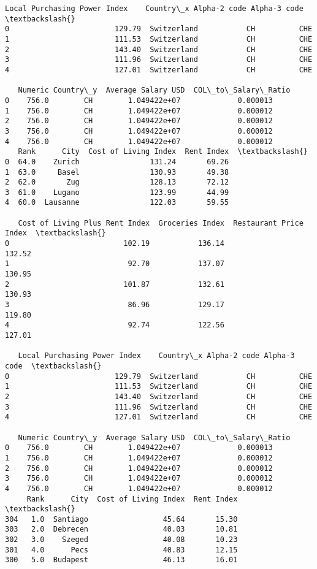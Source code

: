 \documentclass[11pt]{article}
\begin{document}
\begin{Verbatim}[commandchars=\\\{\}]
   Local Purchasing Power Index    Country\_x Alpha-2 code Alpha-3 code  \textbackslash{}
0                        129.79  Switzerland           CH          CHE
1                        111.53  Switzerland           CH          CHE
2                        143.40  Switzerland           CH          CHE
3                        111.96  Switzerland           CH          CHE
4                        127.01  Switzerland           CH          CHE

   Numeric Country\_y  Average Salary USD  COL\_to\_Salary\_Ratio
0    756.0        CH        1.049422e+07             0.000013
1    756.0        CH        1.049422e+07             0.000012
2    756.0        CH        1.049422e+07             0.000012
3    756.0        CH        1.049422e+07             0.000012
4    756.0        CH        1.049422e+07             0.000012
   Rank      City  Cost of Living Index  Rent Index  \textbackslash{}
0  64.0    Zurich                131.24       69.26
1  63.0     Basel                130.93       49.38
2  62.0       Zug                128.13       72.12
3  61.0    Lugano                123.99       44.99
4  60.0  Lausanne                122.03       59.55

   Cost of Living Plus Rent Index  Groceries Index  Restaurant Price Index  \textbackslash{}
0                          102.19           136.14                  132.52
1                           92.70           137.07                  130.95
2                          101.87           132.61                  130.93
3                           86.96           129.17                  119.80
4                           92.74           122.56                  127.01

   Local Purchasing Power Index    Country\_x Alpha-2 code Alpha-3 code  \textbackslash{}
0                        129.79  Switzerland           CH          CHE
1                        111.53  Switzerland           CH          CHE
2                        143.40  Switzerland           CH          CHE
3                        111.96  Switzerland           CH          CHE
4                        127.01  Switzerland           CH          CHE

   Numeric Country\_y  Average Salary USD  COL\_to\_Salary\_Ratio
0    756.0        CH        1.049422e+07             0.000013
1    756.0        CH        1.049422e+07             0.000012
2    756.0        CH        1.049422e+07             0.000012
3    756.0        CH        1.049422e+07             0.000012
4    756.0        CH        1.049422e+07             0.000012
     Rank      City  Cost of Living Index  Rent Index  \textbackslash{}
304   1.0  Santiago                 45.64       15.30
303   2.0  Debrecen                 40.03       10.81
302   3.0    Szeged                 40.08       10.23
301   4.0      Pecs                 40.83       12.15
300   5.0  Budapest                 46.13       16.01


\end{Verbatim}
\end{document}
